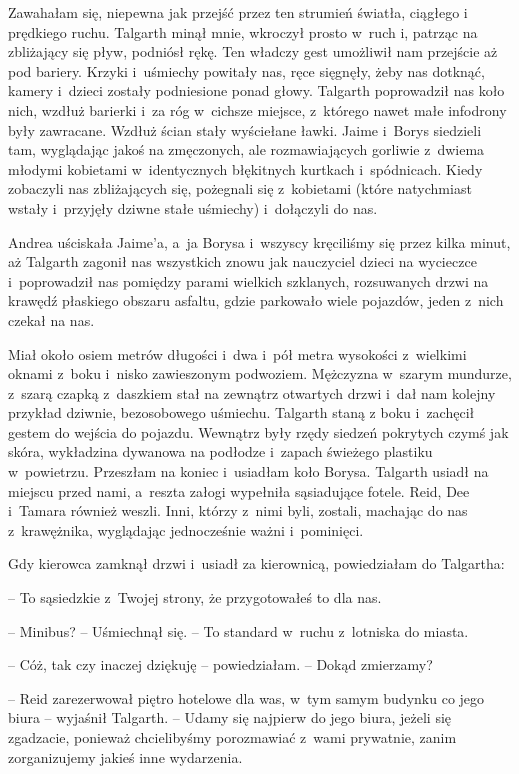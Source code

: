 \documentclass[oneside,polish,11pt,sfheadings]{mwbk}
\begin{document}
Zawahałam się, niepewna jak przejść przez ten strumień światła, ciągłego
i prędkiego ruchu. Talgarth minął mnie, wkroczył prosto w~ruch i,
patrząc na zbliżający się pływ, podniósł rękę. Ten władczy gest
umożliwił nam przejście aż pod bariery. Krzyki i~uśmiechy powitały nas,
ręce sięgnęły, żeby nas dotknąć, kamery i~dzieci zostały podniesione
ponad głowy. Talgarth poprowadził nas koło nich, wzdłuż barierki i~za
róg w~cichsze miejsce, z~którego nawet małe infodrony były zawracane.
Wzdłuż ścian stały wyściełane ławki. Jaime i~Borys siedzieli tam,
wyglądając jakoś na zmęczonych, ale rozmawiających gorliwie z~dwiema
młodymi kobietami w~identycznych błękitnych kurtkach i~spódnicach. Kiedy
zobaczyli nas zbliżających się, pożegnali się z~kobietami (które
natychmiast wstały i~przyjęły dziwne stałe uśmiechy) i~dołączyli do nas.

Andrea uściskała Jaime'a, a~ja Borysa i~wszyscy kręciliśmy się przez
kilka minut, aż Talgarth zagonił nas wszystkich znowu jak nauczyciel
dzieci na wycieczce i~poprowadził nas pomiędzy parami wielkich
szklanych, rozsuwanych drzwi na krawędź płaskiego obszaru asfaltu, gdzie
parkowało wiele pojazdów, jeden z~nich czekał na nas.

Miał około osiem metrów długości i~dwa i~pół metra wysokości z~wielkimi
oknami z~boku i~nisko zawieszonym podwoziem. Mężczyzna w~szarym
mundurze, z~szarą czapką z~daszkiem stał na zewnątrz otwartych drzwi i~dał nam kolejny przykład dziwnie, bezosobowego uśmiechu. Talgarth staną
z boku i~zachęcił gestem do wejścia do pojazdu. Wewnątrz były rzędy
siedzeń pokrytych czymś jak skóra, wykładzina dywanowa na podłodze i~zapach świeżego plastiku w~powietrzu. Przeszłam na koniec i~usiadłam
koło Borysa. Talgarth usiadł na miejscu przed nami, a~reszta załogi
wypełniła sąsiadujące fotele. Reid, Dee i~Tamara również weszli. Inni,
którzy z~nimi byli, zostali, machając do nas z~krawężnika, wyglądając
jednocześnie ważni i~pominięci.

Gdy kierowca zamknął drzwi i~usiadł za kierownicą, powiedziałam do
Talgartha: 

-- To sąsiedzkie z~Twojej strony, że przygotowałeś to dla nas.

-- Minibus? -- Uśmiechnął się. -- To standard w~ruchu z~lotniska do miasta.

-- Cóż, tak czy inaczej dziękuję -- powiedziałam. -- Dokąd zmierzamy?

-- Reid zarezerwował piętro hotelowe dla was, w~tym samym budynku co jego
biura -- wyjaśnił Talgarth. -- Udamy się najpierw do jego biura, jeżeli
się zgadzacie, ponieważ chcielibyśmy porozmawiać z~wami prywatnie, zanim
zorganizujemy jakieś inne wydarzenia.
\end{document}

